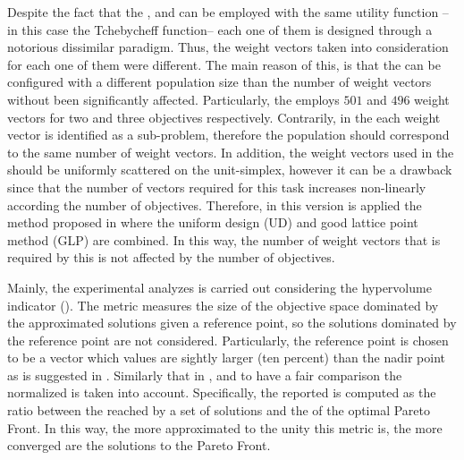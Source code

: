 Despite the fact that the \MOEAD{}, and \RMOEA{} can be employed with the same utility function --in this case the Tchebycheff function-- each one of them is designed through a notorious dissimilar paradigm.
%
Thus, the weight vectors taken into consideration for each one of them were different.
%
The main reason of this, is that the \RMOEA{} can be configured with a different population size than the number of weight vectors without been significantly affected.
%
Particularly, the \RMOEA{} employs $501$ and $496$ weight vectors for two and three objectives respectively.
%
Contrarily, in the \MOEAD{} each weight vector is identified as a sub-problem, therefore the population should correspond to the same number of weight vectors.
%
In addition, the weight vectors used in the \MOEAD{} should be uniformly scattered on the unit-simplex, however it can be a drawback since that the number of vectors required for this task increases non-linearly according the number of objectives.
%
Therefore, in this version is applied the method proposed in \cite{Joel:MOEAD_Uniform_Design, Joel:Kuhn_Munkres} where the uniform design (UD) \cite{Joel:Uniform_Design} and good lattice point method (GLP) are combined.
%
In this way, the number of weight vectors that is required by this \MOEA{} is not affected by the number of objectives.


Mainly, the experimental analyzes is carried out considering the hypervolume indicator (\HV{}).
%
The \HV{} metric measures the size of the objective space dominated by the approximated solutions given a reference point, so the solutions dominated by the reference point are not considered.
%
Particularly, the reference point is chosen to be a vector which values are sightly larger (ten percent) than the nadir point as is suggested in \cite{ishibuchi2017reference}.
%
Similarly that in \cite{li2015evolutionary}, and to have a fair comparison the normalized \HV{} is taken into account.
%
Specifically, the \HV{} reported is computed as the ratio between the \HV{} reached by a set of solutions and the \HV{} of the optimal Pareto Front.
%
In this way, the more approximated to the unity this metric is, the more converged are the solutions to the Pareto Front.
%



